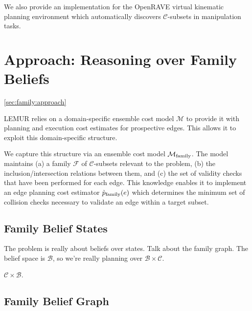 We also provide an implementation for the
OpenRAVE \citep{diankov2010openrave}
virtual kinematic planning environment
which automatically discovers $\mathcal{C}$-subsets
in manipulation tasks.

\section{Approach: Reasoning over Family Beliefs}
\ref{sec:family:approach}

LEMUR relies on a domain-specific ensemble cost model
$\mathcal{M}$ to provide it with planning and execution cost
estimates for prospective edges.
This allows it to exploit this domain-specific structure.

We capture this structure via an ensemble cost model
$\mathcal{M}_{\mbox{\scriptsize family}}$.
The model maintains
(a) a family $\mathcal{F}$ of $\mathcal{C}$-subsets
relevant to the problem,
(b) the inclusion/intersection relations between them,
and (c) the set of validity checks that have been performed
for each edge.
This knowledge enables it to implement an edge
planning cost estimator $\grave{p}_{\mbox{\scriptsize family}}(e)$
which determines the minimum set of collision checks necessary
to validate an edge within a target subset.

\subsection{Family Belief States}

The problem is really about beliefs over states.
Talk about the family graph.
The belief space is $\mathcal{B}$,
so we're really planning over $\mathcal{B} \times \mathcal{C}$.

$\mathcal{C} \times \mathcal{B}$.

\subsection{Family Belief Graph}

